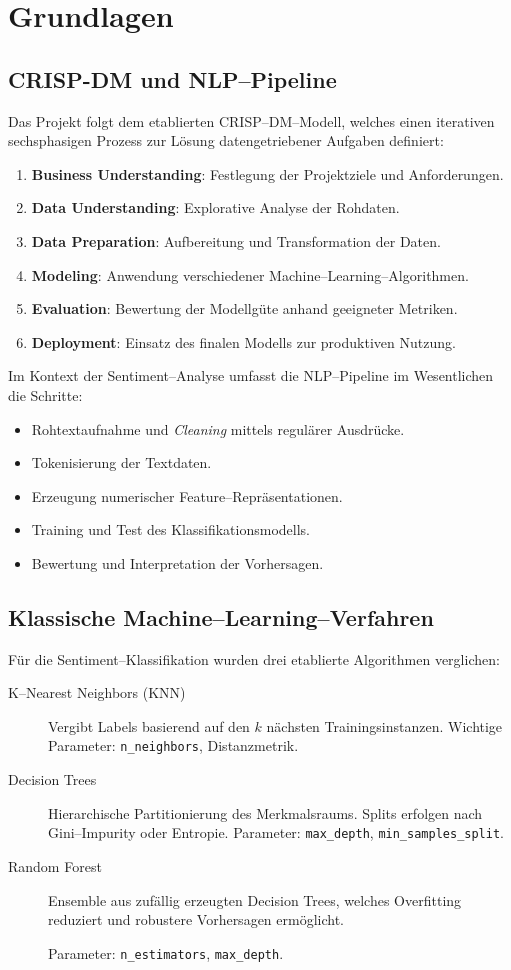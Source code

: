\section{Grundlagen}
\subsection{CRISP-DM und NLP–Pipeline}
Das Projekt folgt dem etablierten CRISP–DM–Modell, welches einen iterativen sechs­phasigen Prozess zur Lösung datengetriebener Aufgaben definiert:
\begin{enumerate}
    \item \textbf{Business Understanding}: Festlegung der Projektziele und Anforderungen.
    \item \textbf{Data Understanding}: Explorative Analyse der Rohdaten.
    \item \textbf{Data Preparation}: Aufbereitung und Transformation der Daten.
    \item \textbf{Modeling}: Anwendung verschiedener Machine–Learning–Algorithmen.
    \item \textbf{Evaluation}: Bewertung der Modellgüte anhand geeigneter Metriken.
    \item \textbf{Deployment}: Einsatz des finalen Modells zur produktiven Nutzung.
\end{enumerate}
Im Kontext der Sentiment–Analyse umfasst die NLP–Pipeline im Wesentlichen die Schritte:
\begin{itemize}
    \item Rohtextaufnahme und \emph{Cleaning} mittels regulärer Ausdrücke.
    \item Tokenisierung der Textdaten.
    \item Erzeugung numerischer Feature–Repräsentationen.
    \item Training und Test des Klassifikationsmodells.
    \item Bewertung und Interpretation der Vorhersagen.
\end{itemize}

\newpage

\subsection{Klassische Machine–Learning–Verfahren}
Für die Sentiment–Klassifikation wurden drei etablierte Algorithmen verglichen:
\begin{description}
    \item[K–Nearest Neighbors (KNN)]  
    Vergibt Labels basierend auf den $k$ nächsten Trainingsinstanzen. Wichtige Parameter: \texttt{n\_neighbors}, Distanzmetrik.
    \item[Decision Trees]  
    Hierarchische Partitionierung des Merkmalsraums. Splits erfolgen nach Gini–Impurity oder Entropie. Parameter: \texttt{max\_depth}, \texttt{min\_samples\_split}.
    \item[Random Forest]  
    Ensemble aus zufällig erzeugten Decision Trees, welches Overfitting reduziert und robustere Vorhersagen ermöglicht.
    
    Parameter: \texttt{n\_estimators}, \texttt{max\_depth}.
\end{description}
